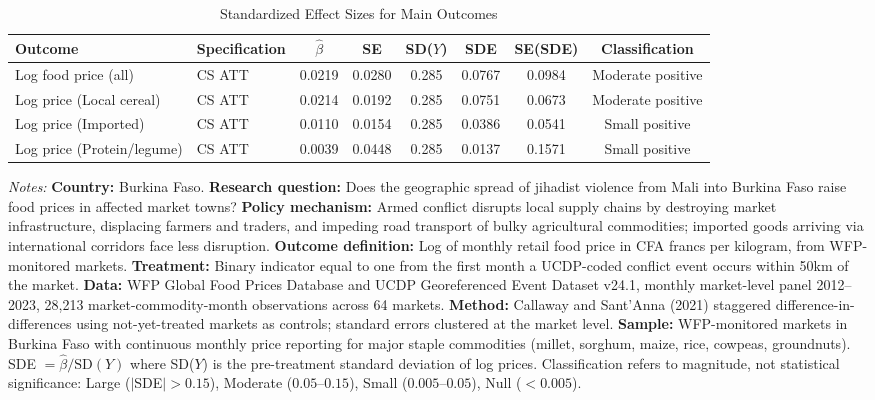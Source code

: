 \begin{table}[H]
\centering
\caption{Standardized Effect Sizes for Main Outcomes}
\label{tab:sde}
\begin{adjustbox}{max width=\textwidth}
\begin{threeparttable}
\begin{tabular}{llcccccc}
\toprule
Outcome & Specification & $\hat{\beta}$ & SE & SD($Y$) & SDE & SE(SDE) & Classification \\
\midrule
Log food price (all) & CS ATT & 0.0219 & 0.0280 & 0.285 & 0.0767 & 0.0984 & Moderate positive \\
Log price (Local cereal) & CS ATT & 0.0214 & 0.0192 & 0.285 & 0.0751 & 0.0673 & Moderate positive \\
Log price (Imported) & CS ATT & 0.0110 & 0.0154 & 0.285 & 0.0386 & 0.0541 & Small positive \\
Log price (Protein/legume) & CS ATT & 0.0039 & 0.0448 & 0.285 & 0.0137 & 0.1571 & Small positive \\
\bottomrule
\end{tabular}
\begin{tablenotes}[flushleft]
\footnotesize
\item \textit{Notes:} \textbf{Country:} Burkina Faso. \textbf{Research question:} Does the geographic spread of jihadist violence from Mali into Burkina Faso raise food prices in affected market towns? \textbf{Policy mechanism:} Armed conflict disrupts local supply chains by destroying market infrastructure, displacing farmers and traders, and impeding road transport of bulky agricultural commodities; imported goods arriving via international corridors face less disruption. \textbf{Outcome definition:} Log of monthly retail food price in CFA francs per kilogram, from WFP-monitored markets. \textbf{Treatment:} Binary indicator equal to one from the first month a UCDP-coded conflict event occurs within 50km of the market. \textbf{Data:} WFP Global Food Prices Database and UCDP Georeferenced Event Dataset v24.1, monthly market-level panel 2012--2023, 28,213 market-commodity-month observations across 64 markets. \textbf{Method:} Callaway and Sant'Anna (2021) staggered difference-in-differences using not-yet-treated markets as controls; standard errors clustered at the market level. \textbf{Sample:} WFP-monitored markets in Burkina Faso with continuous monthly price reporting for major staple commodities (millet, sorghum, maize, rice, cowpeas, groundnuts). SDE $= \hat{\beta} / \text{SD}(Y)$ where SD($Y$) is the pre-treatment standard deviation of log prices. Classification refers to magnitude, not statistical significance: Large ($|$SDE$| > 0.15$), Moderate ($0.05$--$0.15$), Small ($0.005$--$0.05$), Null ($< 0.005$).
\end{tablenotes}
\end{threeparttable}
\end{adjustbox}
\end{table}
